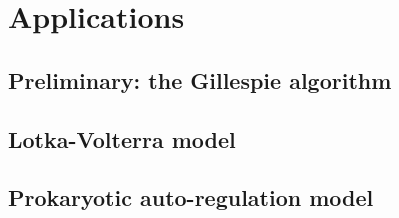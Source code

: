 \chapter{Applications}
\label{chap:applications}

\section{Preliminary: the Gillespie algorithm}

\section{Lotka-Volterra model}

\section{Prokaryotic auto-regulation model}